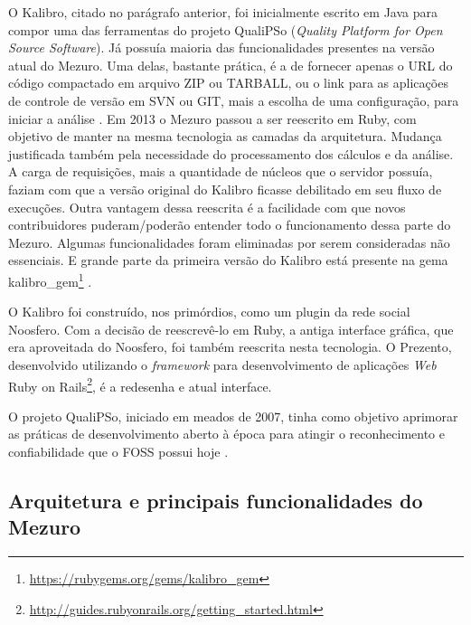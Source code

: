 O Kalibro, citado no parágrafo anterior, foi inicialmente escrito em Java para
compor uma das ferramentas do projeto QualiPSo (\textit{Quality Platform for
Open Source Software}). Já possuía maioria das funcionalidades presentes na
versão atual do Mezuro. Uma delas, bastante prática, é a de fornecer apenas o
URL do código compactado em arquivo ZIP ou TARBALL, ou o link para as
aplicações de controle de versão em SVN ou GIT, mais a escolha de uma
configuração, para iniciar a análise \cite{camarinhaOSS2015}. Em 2013 o Mezuro
passou a ser reescrito em Ruby, com objetivo de manter na mesma tecnologia as
camadas da arquitetura. Mudança justificada também pela necessidade do
processamento dos cálculos e da análise. A carga de requisições, mais a
quantidade de núcleos que o servidor possuía, faziam com que a versão original
do Kalibro ficasse debilitado em seu fluxo de execuções. Outra vantagem dessa
reescrita é a facilidade com que novos contribuidores puderam/poderão entender
todo o funcionamento dessa parte do Mezuro. Algumas funcionalidades foram
eliminadas por serem consideradas não essenciais. E grande parte da primeira
versão do Kalibro está presente na gema
kalibro\_gem\footnote{\url{https://rubygems.org/gems/kalibro_gem}}
\cite{meirellesCibse2015}.



O Kalibro foi construído, nos primórdios, como um plugin da rede social
Noosfero. Com a decisão de reescrevê-lo em Ruby, a antiga interface gráfica,
que era aproveitada do Noosfero, foi também reescrita nesta
tecnologia. O Prezento, desenvolvido utilizando o \textit{framework} para
desenvolvimento de aplicações \textit{Web}
Ruby on Rails\footnote{\url{http://guides.rubyonrails.org/getting_started.html}},
é a redesenha e atual interface.



O projeto QualiPSo, iniciado em meados de 2007, tinha como objetivo aprimorar
as práticas de desenvolvimento aberto à época para atingir o reconhecimento e
confiabilidade que o FOSS possui hoje \cite{messias2012}.

\subsection{Arquitetura e principais funcionalidades do Mezuro}


